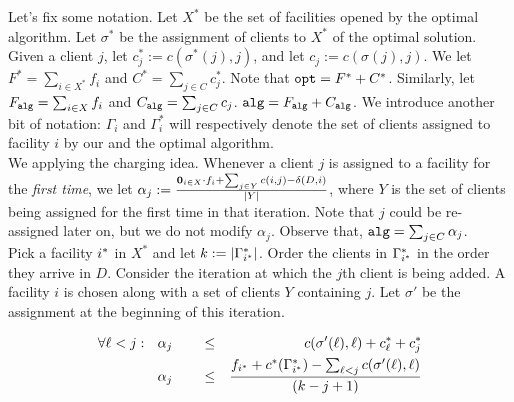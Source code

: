 \documentclass[11pt]{article}
\newtheorem{claim}{Claim}
\def\opt{{\tt opt}}
\def\alg{{\tt alg}}
\begin{document}
\noindent
Let's fix some notation. Let $X^*$ be the set of facilities opened by the optimal algorithm. Let $\sigma^*$ 
be the assignment of clients to $X^*$ of the optimal solution. Given a client $j$, let $c^*_j := c(\sigma^*(j),j)$,
and let $c_j := c(\sigma(j),j)$. We let $F^* = \sum_{i\in X^*}f_i$ and $C^* = \sum_{j\in C}c^*_j$.
Note that $\opt =  F^* + C^*$. Similarly, let $F_{\alg} =  \sum_{i\in X}f_i $ and $C_{\alg}=  \sum_{j\in C}c_j$. 
$\alg =  F_{\alg} + C_{\alg}$. We introduce another bit of notation: $\Gamma_i$ and $\Gamma^*_i$ will respectively denote the set of clients assigned to facility $i$ by our and the optimal algorithm. \\

\noindent
We applying the charging idea. Whenever a client $j$ is assigned to a facility for the {\em first time}, 
we let $\alpha_j :=  \frac{{\bf 0}_{i\in X}\cdot f_i + \sum_{j\in Y} c(i,j) - \delta(D,i)}{|Y|}$, where $Y$ 
is the set of clients being assigned for the first time in that iteration. Note that $j$ could be re-assigned
later on, but we do not modify $\alpha_j$. Observe that, $\alg = \sum_{j\in C} \alpha_j$.  \\
%

\noindent
Pick a facility ${i^*}$ in $X^*$ and let $k:=|\Gamma^*_{i^*}|$. 
Order the clients in $\Gamma^*_{i^*}$ in the order they arrive in $D$.
Consider the iteration at which the $j$th client is being added. A facility $i$ is chosen along with 
a set of clients $Y$ containing $j$. Let $\sigma'$ be the assignment at the beginning of this iteration. 


\begin{align}
\forall \ell < j: ~~ \alpha_j &\qquad \le & c(\sigma'(\ell),\ell) + c^*_\ell + c^*_j \label{eq:eq1} \\
\alpha_j & \qquad \le & \frac{f_{i^*} + c^*(\Gamma^*_{i^*}) - \sum_{\ell < j}c(\sigma'(\ell),\ell)}{(k-j+1)} \label{eq:eq2}
\end{align}
\end{document}
